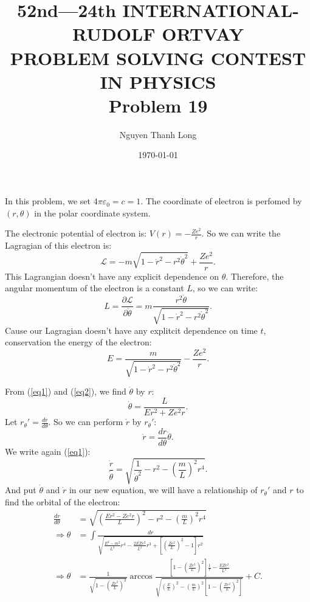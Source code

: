 \documentclass[12pt]{article}
\title{52nd—24th INTERNATIONAL-RUDOLF ORTVAY \\ PROBLEM SOLVING CONTEST IN PHYSICS \\ Problem 19}
\author{Nguyen Thanh Long}
\date{\today}
\begin{document}
	
\maketitle

\noindent In this problem, we set $4\pi \varepsilon_0 = c = 1$. The coordinate of electron is perfomed by $(r, \theta)$ in the polar coordinate system.
	
\noindent The electronic potential of electron is: $ V(r) = - \frac{Ze^2}{r}$. So we can write the Lagragian of this electron \cite{1} is: 
$$ \mathcal{L} = - m \sqrt{ 1 - \dot{r}^2 - r^2 \dot{\theta}^2 } + \frac{Z e^2}{r}. $$
\noindent This Lagrangian doesn't have any explicit dependence on $\theta$. Therefore, the angular momentum of the electron is a constant $L$, so we can write:
\begin{equation} \label{eq1}
	L = \frac{\partial \mathcal{L} }{\partial \dot{\theta}} = m \frac{ r^2 \dot{\theta} }{\sqrt{1 - \dot{r}^2 - r^2 \dot{\theta}^2 }} .
\end{equation}
\noindent Cause our Lagragian doesn't have any explitcit dependence on time $t$, conservation the energy of the electron:
\begin{equation} \label{eq2}
	E = \frac{ m }{\sqrt{ 1 - \dot{r}^2 - r^2 \dot{\theta}^2 }} - \frac{Ze^2}{r} .
\end{equation}

\noindent From (\ref{eq1}) and (\ref{eq2}), we find $\dot{\theta}$ by $r$: 
\begin{equation} \label{eq3}
	\dot{\theta} = \frac{L}{E r^2 + Z e^2 r}.
\end{equation}	
\noindent Let $r_{\theta}' = \frac{dr}{d \theta}$. So we can perform $\dot{r}$ by $r_{\theta}'$: 
$$ \dot{r} = \frac{d r}{d \theta} \dot{\theta}.$$
\noindent We write again (\ref{eq1}):
$$ \frac{ \dot{r} }{ \dot{\theta} } = \sqrt{ \frac{1}{ \dot{\theta}^2} - r^2 - \left( \frac{m}{L} \right)^2 r^4 }  .$$
\noindent And put $\dot{\theta}$ and $\dot{r}$ in our new equation, we will have a relationship of $r_{\theta}'$ and $r$ to find the orbital of the electron:
\begin{align*}
	\frac{d r}{d \theta} & =  \sqrt{ \left( \frac{ E r^2 - Z e^2 r }{L} \right)^2 - r^2 - \left( \frac{m}{L} \right)^2 r^4 } \\
	\Rightarrow \theta & = \int \frac{dr}{ \sqrt{ \frac{E^2 - m^2}{L^2} r^4 - \frac{2 E Z e^2}{L^2} r^3 + \left[ \left( \frac{ Z e^2}{L} \right)^2 -1 \right] r^2 } } \\
	\Rightarrow \theta & = \frac{1}{ \sqrt{ 1 - \left( \frac{Ze^2}{L} \right)^2 }} \arccos \frac{ \left[ 1 - \left( \frac{ Z e^2}{L} \right)^2 \right] \frac{1}{r} - \frac{E Z e^2}{L^2} }{\sqrt{ \left( \frac{E}{L} \right)^2 - \left( \frac{m}{L} \right)^2 \left[ 1 - \left( \frac{ Z e^2}{L} \right)^2 \right]}} +C .
\end{align*}	
\end{document}
